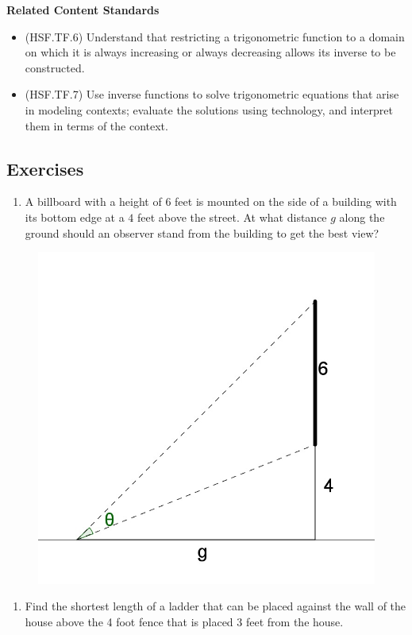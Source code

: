 \documentclass[
]{book}
\providecommand{\tightlist}{%
  \setlength{\itemsep}{0pt}\setlength{\parskip}{0pt}}
\newenvironment{standards}{}{}
\theoremstyle{definition}
\theoremstyle{definition}
\theoremstyle{definition}
\theoremstyle{definition}
\theoremstyle{remark}
\begin{document}
\begin{standards}

\begin{center}
\textbf{Related Content Standards}

\end{center}

\begin{itemize}
\tightlist
\item
  (HSF.TF.6) Understand that restricting a trigonometric function to a domain on which it is always increasing or always decreasing allows its inverse to be constructed.
\item
  (HSF.TF.7) Use inverse functions to solve trigonometric equations that arise in modeling contexts; evaluate the solutions using technology, and interpret them in terms of the context.
\end{itemize}

\end{standards}

\hypertarget{exercises-34}{%
\subsection{Exercises}\label{exercises-34}}

\begin{enumerate}
\def\labelenumi{\arabic{enumi}.}
\tightlist
\item
  A billboard with a height of \(6\) feet is mounted on the side of a building with its bottom edge at a \(4\) feet above the street. At what distance \(g\) along the ground should an observer stand from the building to get the best view?
\end{enumerate}

\begin{figure}

{\centering \includegraphics[width=0.3\linewidth]{images/billboard} 

}

\end{figure}

\begin{enumerate}
\def\labelenumi{\arabic{enumi}.}
\setcounter{enumi}{1}
\tightlist
\item
  Find the shortest length of a ladder that can be placed against the wall of the house above the 4 foot fence that is placed 3 feet from the house.
\end{enumerate}
\end{document}
